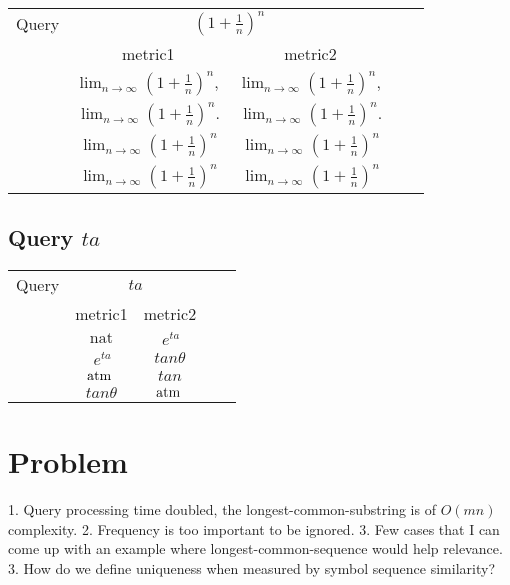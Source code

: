 \documentclass[12pt]{article} %
\begin{document}
\begin{center}
\begin{tabular}{lcccc}
Query  & \multicolumn{2}{c}{ $(1+ \frac 1 n)^n$ } \\ & metric1 & metric2 \\
\hline
 &  $ \lim_{n\to\infty}\left(1+\frac{1}{n}\right)^{n},   $ & $    \lim_{n\to\infty}\left(1+\frac{1}{n}\right)^{n},         $ \\
 &  $ \lim_{n\to\infty}\left(1+\frac{1}{n}\right)^{n}.  $ & $   \lim_{n\to\infty}\left(1+\frac{1}{n}\right)^{n}.$ \\
 &  $ \lim_{n\to\infty}\left(1+\frac{1}{n}\right)^{n} $ & $  \lim_{n\to\infty}\left(1+\frac{1}{n}\right)^{n} $ \\
 &  $  \lim_{n\to\infty}\left(1+\frac{1}{n}\right)^{n}   $ & $  \lim_{n\to\infty}\left(1+\frac{1}{n}\right)^{n} $ \\
\end{tabular}
\end{center}

\pagebreak

\subsection{Query $ta$}

\begin{center}
\begin{tabular}{lcccc}
Query  & \multicolumn{2}{c}{ $ta$ } \\ & metric1 & metric2 \\
\hline
 &  $  \mathrm{nat}   $ & $   \,e^{ta} $ \\
 &  $  \,e^{ta}  $ & $   tanθ                    $ \\
 &  $ \rm atm\,    $ & $ tan                      $ \\
 &  $ tanθ  $ & $ \rm atm\, $ \\
\end{tabular}
\end{center}

\section*{Problem}
1. Query processing time doubled, the longest-common-substring is of $O(mn)$ complexity. 
2. Frequency is too important to be ignored.
3. Few cases that I can come up with an example where longest-common-sequence would help relevance.
3. How do we define uniqueness when measured by symbol sequence similarity?
\end{document}
